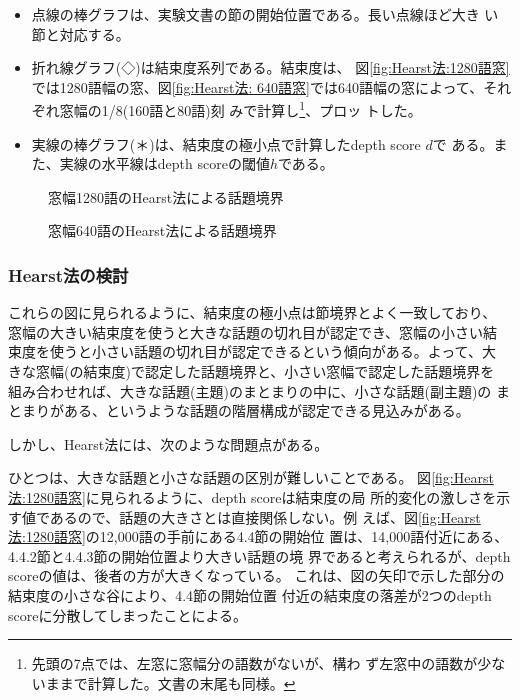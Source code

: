 \begin{itemize}
\item 点線の棒グラフは、実験文書の節の開始位置である。長い点線ほど大き
  い節と対応する。
\item 折れ線グラフ(◇)は結束度系列である。結束度は、
  図\ref{fig:Hearst法:1280語窓}では1280語幅の窓、図\ref{fig:Hearst法:
    640語窓}では640語幅の窓によって、それぞれ窓幅の1/8(160語と80語)刻
  みで計算し\footnote{先頭の7点では、左窓に窓幅分の語数がないが、構わ
    ず左窓中の語数が少ないままで計算した。文書の末尾も同様。}、プロッ
  トした。
\item 実線の棒グラフ(＊)は、結束度の極小点で計算したdepth score $d$で
  ある。また、実線の水平線はdepth scoreの閾値$h$である。
\end{itemize}

\begin{figure}[htbp]
  \begin{center}
    \leavevmode
    \caption{窓幅1280語のHearst法による話題境界}
    \label{fig:Hearst法:1280語窓}
  \end{center}
  \begin{center}
    \leavevmode
    \caption{窓幅640語のHearst法による話題境界}
    \label{fig:Hearst法:640語窓}
  \end{center}
\end{figure}

\subsubsection{Hearst法の検討}\label{sect:Hearst法の検討}

これらの図に見られるように、結束度の極小点は節境界とよく一致しており、
窓幅の大きい結束度を使うと大きな話題の切れ目が認定でき、窓幅の小さい結
束度を使うと小さい話題の切れ目が認定できるという傾向がある。よって、大
きな窓幅(の結束度)で認定した話題境界と、小さい窓幅で認定した話題境界を
組み合わせれば、大きな話題(主題)のまとまりの中に、小さな話題(副主題)の
まとまりがある、というような話題の階層構成が認定できる見込みがある。

しかし、Hearst法には、次のような問題点がある。

ひとつは、大きな話題と小さな話題の区別が難しいことである。
図\ref{fig:Hearst法:1280語窓}に見られるように、depth scoreは結束度の局
所的変化の激しさを示す値であるので、話題の大きさとは直接関係しない。例
えば、図\ref{fig:Hearst法:1280語窓}の12,000語の手前にある4.4節の開始位
置は、14,000語付近にある、4.4.2節と4.4.3節の開始位置より大きい話題の境
界であると考えられるが、depth scoreの値は、後者の方が大きくなっている。
これは、図の矢印で示した部分の結束度の小さな谷により、4.4節の開始位置
付近の結束度の落差が2つのdepth scoreに分散してしまったことによる。

